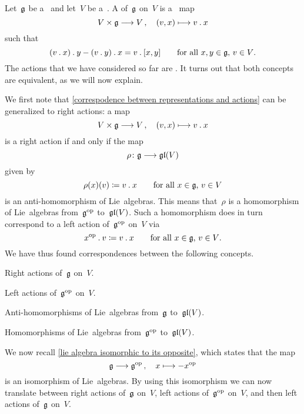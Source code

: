\begin{remark}
  \label{right representations}
  Let~$\mathfrak{g}$ be a~{\liealgebra{$\kf$}} and let~$V$ be a~\vectorspace{$\kf$}.
  A  of~$\mathfrak{g}$ on~$V$ is a~{\bilinear{$\kf$}} map
  \[
    V \times \glie
    \to
    V \,,
    \quad
    (v,x)
    \mapsto
    v \act x
  \]
  such that
  \begin{equation}
    \label{right action}
    (v \mathbin{.} x) \mathbin{.} y - (v \mathbin{.} y) \mathbin{.} x
    =
    v \mathbin{.} [x,y]
    \qquad
    \text{for all~$x, y \in \mathfrak{g}$,~$v \in V$.}
  \end{equation}
  The actions that we have considered so far are .
  It turns out that both concepts are equivalent, as we will now explain.

  We first note that \cref{correspodence between representations and actions} can be generalized to right actions:
  a map
  \[
    V \times \glie
    \to
    V \,,
    \quad
    (v,x)
    \mapsto
    v \act x
  \]
  is a right action if and only if the map
  \[
    \rho
    \colon
    \glie
    \to
    \gllie(V)
  \]
  given by
  \[
    \rho(x)(v)
    \coloneqq
    v \mathbin{.} x
    \qquad
    \text{for all~$x \in \mathfrak{g}$,~$v \in V$}
  \]
  is an anti-homomorphism of Lie~algebras.
  This means that~$\rho$ is a homomorphism of Lie~algebras from~$\mathfrak{g}^{\mathrm{op}}$ to~$\mathfrak{gl}(V)$.
  Such a homomorphism does in turn correspond to a left action of~$\mathfrak{g}^{\mathrm{op}}$ on~$V$ via
  \[
    x^{\mathrm{op}} \mathbin{.} v
    \coloneqq
    v \mathbin{.} x
    \qquad
    \text{for all~$x \in \mathfrak{g}$,~$v \in V$.}
  \]
  We have thus found {\onetoonetext} correspondences between the following concepts.
  \begin{equivalenceslist*}
    \item
      Right actions of~$\mathfrak{g}$ on~$V$.
    \item
      Left actions of~$\mathfrak{g}^{\mathrm{op}}$ on~$V$.
    \item
      Anti-homomorphisms of Lie~algebras from~$\mathfrak{g}$ to~$\mathfrak{gl}(V)$.
    \item
      Homomorphisms of Lie~algebras from~$\mathfrak{g}^{\mathrm{op}}$ to~$\mathfrak{gl}(V)$.
  \end{equivalenceslist*}
  We now recall \cref{lie algebra isomorphic to its opposite}, which states that the map
  \[
    \glie
    \to
    \glie^{\op} \,,
    \quad
    x
    \mapsto
    -x^{\op}
  \]
  is an isomorphism of Lie~algebras.
  By using this isomorphism we can now translate between right actions of~$\mathfrak{g}$ on~$V$, left actions of~$\mathfrak{g}^{\mathrm{op}}$ on~$V$, and then left actions of~$\mathfrak{g}$ on~$V$.


\end{remark}
